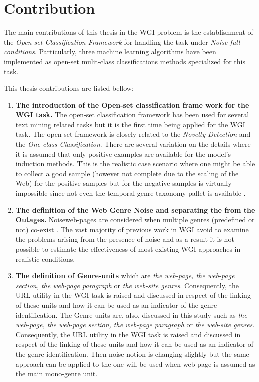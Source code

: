 \section{Contribution} \label{chap:introduction:sec:contribution}

The main contributions of this thesis in the WGI problem is the establishment of the \textit{Open-set Classification Framework} for handling the task under \textit{Noise-full conditions}. Particularly, three machine learning algorithms have been implemented as open-set mulit-class classifications methods specialized for this task. 

This thesis contributions are listed bellow:

\begin{enumerate}
\item \textbf{The introduction of the Open-set classification frame work for the WGI task.} The open-set classification framework has been used for several text mining related tasks but it is the first time being applied for the WGI task. The open-set framework is closely related to the \textit{Novelty Detection} and the \textit{One-class Classification}. There are several variation on the details  where it is assumed that only positive examples are available for the model's induction methods. This is the realistic case scenario where one might be able to collect a good sample (however not complete due to the scaling of the Web) for the positive samples but for the negative samples is virtually impossible since not even the temporal genre-taxonomy pallet is available \cite{geng2018recent}.
\item \textbf{The definition of  the Web Genre Noise and separating the from the Outages.} {Noise}web-pages are considered when multiple genres (predefined or not) co-exist \parencite{santini2011cross,levering2008using}. The vast majority of previous work in WGI avoid to examine the problems arising from the presence of noise and as a result it is not possible to estimate the effectiveness of most existing WGI approaches in realistic conditions.
\item \textbf{The definition of Genre-units} which are \textit{the web-page, the web-page section, the web-page paragraph} or \textit{the web-site genres}. Consequently, the URL utility in the WGI task is raised and discussed in respect of the linking of these units and how it can be used as an indicator of the genre-identification. The Genre-units are, also, discussed in this study such as \textit{the web-page, the web-page section, the web-page paragraph} or \textit{the web-site genres}. Consequently, the URL utility in the WGI task is raised and discussed in respect of the linking of these units and how it can be used as an indicator of the genre-identification. Then noise notion is changing slightly but the same approach can be applied to the one will be used when web-page is assumed as the main mono-genre unit.

\end{enumerate}
